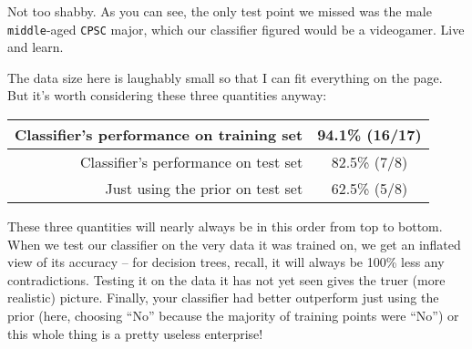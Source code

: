 Not too shabby. As you can see, the only test point we missed was the male
\texttt{middle}-aged \texttt{CPSC} major, which our classifier figured would
be a videogamer. Live and learn.

The data size here is laughably small so that I can fit everything on the page.
But it's worth considering these three quantities anyway:

\begin{center}
\begin{tabular}{r|c}
Classifier's performance on training set & 94.1\% (16/17) \\
\hline
Classifier's performance on test set & 82.5\% (7/8) \\
\hline
Just using the prior on test set & 62.5\% (5/8) \\
\end{tabular}
\end{center}


These three quantities will nearly always be in this order from top to bottom.
When we test our classifier on the very data it was trained on, we get an
inflated view of its accuracy -- for decision trees, recall, it will always be
100\% less any contradictions. Testing it on the data it has not yet seen gives
the truer (more realistic) picture. Finally, your classifier had better
outperform just using the prior (here, choosing ``No'' because the majority of
training points were ``No'') or this whole thing is a pretty useless
enterprise!
